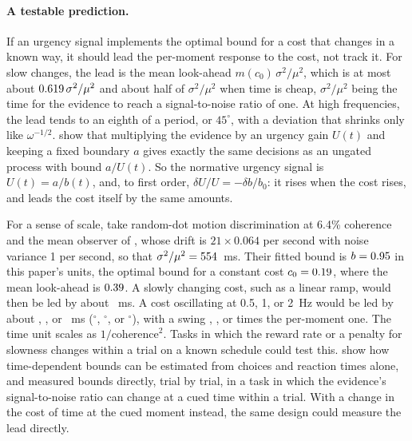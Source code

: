 \documentclass[11pt]{article}
\theoremstyle{definition}
\theoremstyle{remark}
\begin{document}
\paragraph{A testable prediction.}
If an urgency signal implements the optimal bound for a cost that changes in a known way, it
should lead the per-moment response to the cost, not track it. For slow changes, the lead is the
mean look-ahead $m(c_0)\,\sigma^2/\mu^2$, which is at most about $0.619\,\sigma^2/\mu^2$ and
about half of $\sigma^2/\mu^2$ when time is cheap, $\sigma^2/\mu^2$ being the time for the evidence
to reach a signal-to-noise ratio of one. At high frequencies, the lead tends to an eighth of a period, or $45^\circ$, with a deviation
that shrinks only like $\omega^{-1/2}$.  show that multiplying the evidence by an urgency gain $U(t)$ and keeping a
fixed boundary $a$ gives exactly the same decisions as an ungated process with bound $a/U(t)$. So
the normative urgency signal is $U(t) = a/b(t)$, and, to first order, $\delta U/U = -\delta b/b_0$: it
rises when the cost rises, and leads the cost itself by the same amounts.

For a sense of scale, take random-dot motion discrimination at 6.4\% coherence and the mean
observer of \citet{palmer2005}, whose drift is $21 \times 0.064$ per second with noise variance 1
per second, so that $\sigma^2/\mu^2 = 554$~ms. Their fitted bound is $b = 0.95$ in this
paper's units, the optimal bound for a constant cost $c_0 = 0.19$, where the mean look-ahead
is $0.39$. A slowly changing cost, such as a linear ramp, would then be led by about \PalmerLead~ms. A cost
oscillating at 0.5, 1, or 2~Hz would be led by about \PalmerLeadMsHalfHz, \PalmerLeadMsOneHz, or
\PalmerLeadMsTwoHz~ms (\PalmerDegHalfHz$^\circ$, \PalmerDegOneHz$^\circ$, or
\PalmerDegTwoHz$^\circ$), with a swing \PalmerGainHalfHz, \PalmerGainOneHz, or \PalmerGainTwoHz{}
times the per-moment one. The time unit scales as $1/\text{coherence}^2$. Tasks in
which the reward rate or a penalty for slowness changes within a trial on a known schedule could
test this. \citet{kira2025} show how time-dependent bounds can be estimated from choices and reaction
times alone, and \citet{kalburge2026} measured bounds directly, trial by trial, in a task in which the
evidence's signal-to-noise ratio can change at a cued time within a trial. With a change in the cost
of time at the cued moment instead, the same design could measure the lead directly.
\end{document}
